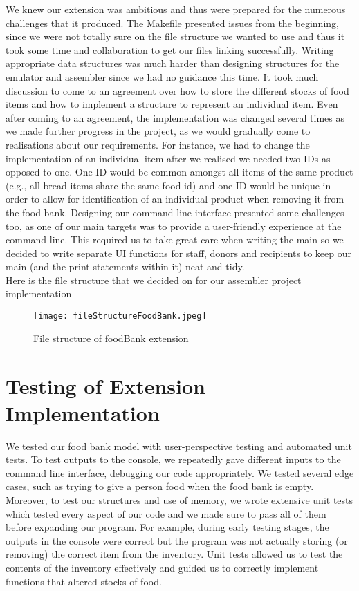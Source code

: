 \documentclass [10pt] {article}
\begin{document}
We knew our extension was ambitious and thus were prepared for the numerous challenges that it produced. The Makefile presented issues from the beginning, since we were not totally sure on the file structure we wanted to use and thus it took some time and collaboration to get our files linking successfully. Writing appropriate data structures was much harder than designing structures for the emulator and assembler since we had no guidance this time. It took much discussion to come to an agreement over how to store the different stocks of food items and how to implement a structure to represent an individual item. Even after coming to an agreement, the implementation was changed several times as we made further progress in the project, as we would gradually come to realisations about our requirements. For instance, we had to change the implementation of an individual item after we realised we needed two IDs as opposed to one. One ID would be common amongst all items of the same product (e.g., all bread items share the same food id) and one ID would be unique in order to allow for identification of an individual product when removing it from the food bank. Designing our command line interface presented some challenges too, as one of our main targets was to provide a user-friendly experience at the command line. This required us to take great care when writing the main so we decided to write separate UI functions for staff, donors and recipients to keep our main (and the print statements within it) neat and tidy.
\vspace {0.3cm}
\\
Here is the file structure that we decided on for our assembler project implementation
\vspace {0.3cm}
\\

\begin{figure}[htp]
    \centering
    \texttt{[image: fileStructureFoodBank.jpeg]}
    \caption{File structure of foodBank extension}
    \label{fig:file structure foodBank}
\end{figure}

\section*{Testing of Extension Implementation}
We tested our food bank model with user-perspective testing and automated unit tests. To test outputs to the console, we repeatedly gave different inputs to the command line interface, debugging our code appropriately. We tested several edge cases, such as trying to give a person food when the food bank is empty. Moreover, to test our structures and use of memory, we wrote extensive unit tests which tested every aspect of our code and we made sure to pass all of them before expanding our program. For example, during early testing stages, the outputs in the console were correct but the program was not actually storing (or removing) the correct item from the inventory. Unit tests allowed us to test the contents of the inventory effectively and guided us to correctly implement functions that altered stocks of food.
\end{document}
